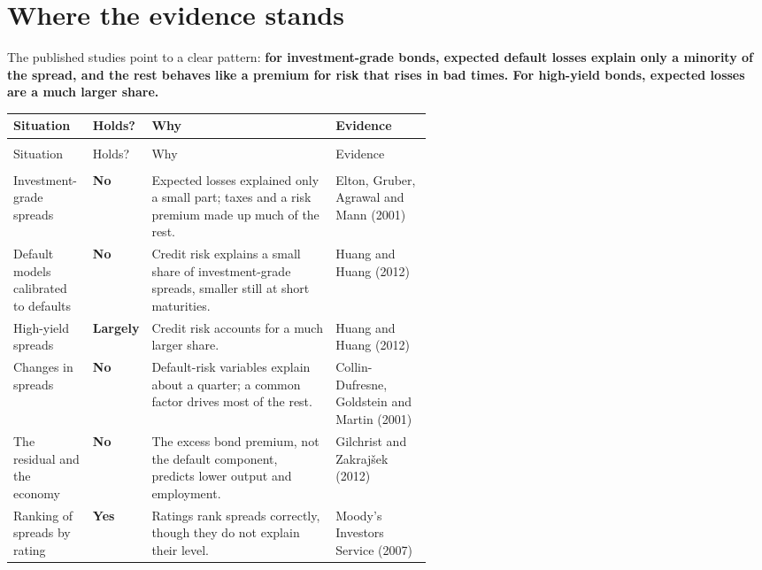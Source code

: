 \section{Where the evidence stands}
\label{sec:15-verdict}

The published studies point to a clear pattern: \textbf{for investment-grade bonds, expected default losses explain only a minority of the spread, and the rest behaves like a premium for risk that rises in bad times. For high-yield bonds, expected losses are a much larger share.}

{\small
\begin{longtable}{@{}>{\raggedright\arraybackslash}p{0.19\linewidth}>{\raggedright\arraybackslash}p{0.13\linewidth}>{\raggedright\arraybackslash}p{}>{\raggedright\arraybackslash}p{0.23\linewidth}@{}}
\toprule
Situation & Holds? & Why & Evidence \\
\midrule
\endfirsthead
\multicolumn{4}{@{}l}{\emph{(continued)}} \\
\toprule
Situation & Holds? & Why & Evidence \\
\midrule
\endhead
\midrule
\multicolumn{4}{r@{}}{\emph{(continued on the next page)}} \\
\endfoot
\bottomrule
\endlastfoot
Investment-grade spreads & \textbf{No} & Expected losses explained only a small part; taxes and a risk premium made up much of the rest. & Elton, Gruber, Agrawal and Mann (2001) \\*
\addlinespace[3pt]
Default models calibrated to defaults & \textbf{No} & Credit risk explains a small share of investment-grade spreads, smaller still at short maturities. & Huang and Huang (2012) \\
\addlinespace[3pt]
High-yield spreads & \textbf{Largely} & Credit risk accounts for a much larger share. & Huang and Huang (2012) \\
\addlinespace[3pt]
Changes in spreads & \textbf{No} & Default-risk variables explain about a quarter; a common factor drives most of the rest. & Collin-Dufresne, Goldstein and Martin (2001) \\
\addlinespace[3pt]
The residual and the economy & \textbf{No} & The excess bond premium, not the default component, predicts lower output and employment. & Gilchrist and Zakraj\v{s}ek (2012) \\*
\addlinespace[3pt]
Ranking of spreads by rating & \textbf{Yes} & Ratings rank spreads correctly, though they do not explain their level. & Moody's Investors Service (2007) \\
\end{longtable}
\addtocounter{table}{-1}%
}

